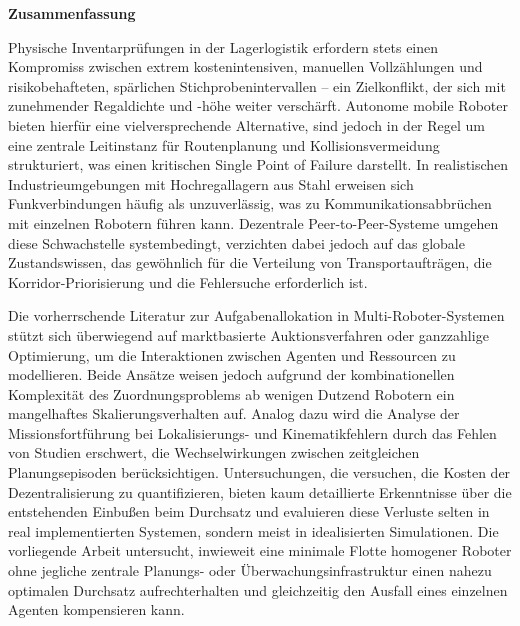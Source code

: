 \thispagestyle{empty}
\vspace*{1.0cm}

\begin{center}
    \textbf{Zusammenfassung}
\end{center}

\vspace*{0.5cm}

\noindent
Physische Inventarprüfungen in der Lagerlogistik erfordern stets einen Kompromiss zwischen extrem kostenintensiven, manuellen Vollzählungen und risikobehafteten, spärlichen Stichprobenintervallen – ein Zielkonflikt, der sich mit zunehmender Regaldichte und -höhe weiter verschärft. Autonome mobile Roboter bieten hierfür eine vielversprechende Alternative, sind jedoch in der Regel um eine zentrale Leitinstanz für Routenplanung und Kollisionsvermeidung strukturiert, was einen kritischen Single Point of Failure darstellt. In realistischen Industrieumgebungen mit Hochregallagern aus Stahl erweisen sich Funkverbindungen häufig als unzuverlässig, was zu Kommunikationsabbrüchen mit einzelnen Robotern führen kann. Dezentrale Peer-to-Peer-Systeme umgehen diese Schwachstelle systembedingt, verzichten dabei jedoch auf das globale Zustandswissen, das gewöhnlich für die Verteilung von Transportaufträgen, die Korridor-Priorisierung und die Fehlersuche erforderlich ist.

\vspace*{0.3cm}
\noindent
Die vorherrschende Literatur zur Aufgabenallokation in Multi-Roboter-Systemen stützt sich überwiegend auf marktbasierte Auktionsverfahren oder ganzzahlige Optimierung, um die Interaktionen zwischen Agenten und Ressourcen zu modellieren. Beide Ansätze weisen jedoch aufgrund der kombinationellen Komplexität des Zuordnungsproblems ab wenigen Dutzend Robotern ein mangelhaftes Skalierungsverhalten auf. Analog dazu wird die Analyse der Missionsfortführung bei Lokalisierungs- und Kinematikfehlern durch das Fehlen von Studien erschwert, die Wechselwirkungen zwischen zeitgleichen Planungsepisoden berücksichtigen. Untersuchungen, die versuchen, die Kosten der Dezentralisierung zu quantifizieren, bieten kaum detaillierte Erkenntnisse über die entstehenden Einbußen beim Durchsatz und evaluieren diese Verluste selten in real implementierten Systemen, sondern meist in idealisierten Simulationen. Die vorliegende Arbeit untersucht, inwieweit eine minimale Flotte homogener Roboter ohne jegliche zentrale Planungs- oder Überwachungsinfrastruktur einen nahezu optimalen Durchsatz aufrechterhalten und gleichzeitig den Ausfall eines einzelnen Agenten kompensieren kann.


